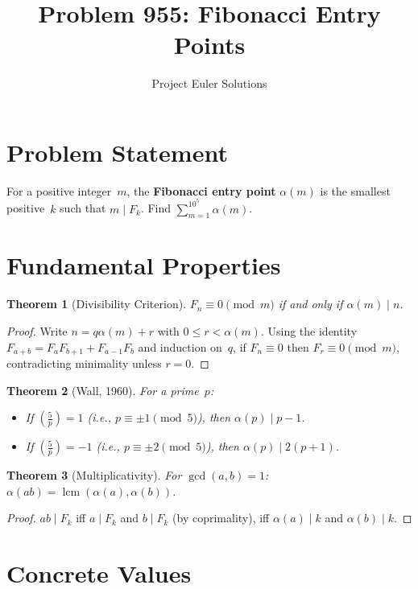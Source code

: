 \documentclass[11pt]{article}
\title{Problem 955: Fibonacci Entry Points}
\author{Project Euler Solutions}
\date{}
\newtheorem{theorem}{Theorem}
\begin{document}
\maketitle

\section{Problem Statement}

For a positive integer~$m$, the \textbf{Fibonacci entry point} $\alpha(m)$ is the smallest positive~$k$ such that $m \mid F_k$. Find $\sum_{m=1}^{10^5} \alpha(m)$.

\section{Fundamental Properties}

\begin{theorem}[Divisibility Criterion]
$F_n \equiv 0 \pmod{m}$ if and only if $\alpha(m) \mid n$.
\end{theorem}

\begin{proof}
Write $n = q\alpha(m) + r$ with $0 \le r < \alpha(m)$. Using the identity $F_{a+b} = F_a F_{b+1} + F_{a-1}F_b$ and induction on~$q$, if $F_n \equiv 0$ then $F_r \equiv 0 \pmod{m}$, contradicting minimality unless $r=0$.
\end{proof}

\begin{theorem}[Wall, 1960]
For a prime~$p$:
\begin{itemize}
\item If $\left(\frac{5}{p}\right) = 1$ (i.e., $p \equiv \pm1 \pmod{5}$), then $\alpha(p) \mid p-1$.
\item If $\left(\frac{5}{p}\right) = -1$ (i.e., $p \equiv \pm2 \pmod{5}$), then $\alpha(p) \mid 2(p+1)$.
\end{itemize}
\end{theorem}

\begin{theorem}[Multiplicativity]
For $\gcd(a,b) = 1$: $\alpha(ab) = \operatorname{lcm}(\alpha(a), \alpha(b))$.
\end{theorem}

\begin{proof}
$ab \mid F_k$ iff $a \mid F_k$ and $b \mid F_k$ (by coprimality), iff $\alpha(a) \mid k$ and $\alpha(b) \mid k$.
\end{proof}

\section{Concrete Values}
\end{document}
